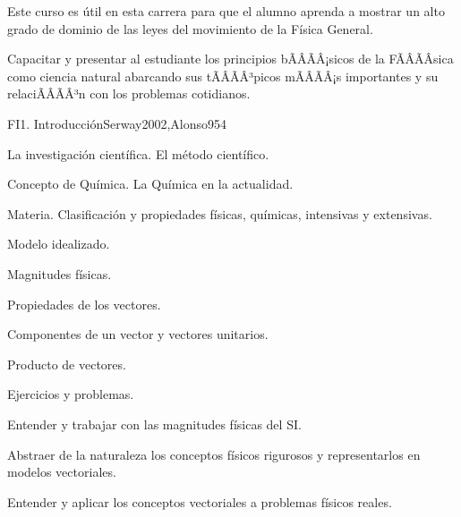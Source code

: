 \begin{sumilla}


\begin{fundamentacion}
Este curso es \'util en esta carrera para que el alumno aprenda a mostrar un alto grado de dominio de las leyes del movimiento de la F\'isica General.
\end{fundamentacion}

\begin{objetivosdelcurso}
\item Capacitar y presentar al estudiante los principios bÃÂÃÂ¡sicos de la FÃÂÃÂ­sica como ciencia natural abarcando sus tÃÂÃÂ³picos mÃÂÃÂ¡s importantes y su relaciÃÂÃÂ³n con los problemas cotidianos.
\end{objetivosdelcurso}

\begin{outcomes}
\end{outcomes}

\begin{unit}{FI1. Introducci\'on}{Serway2002,Alonso95}{4}
\begin{topicos}
      \item La investigaci\'on cient\'ifica. El m\'etodo cient\'ifico.
      \item Concepto de Qu\'imica. La Qu\'imica en la actualidad.
      \item Materia. Clasificaci\'on y propiedades f\'isicas, qu\'imicas, intensivas y extensivas.
      \item Modelo idealizado.
      \item Magnitudes f\'isicas.
      \item Propiedades de los vectores.
      \item Componentes de un vector y vectores unitarios.
      \item Producto de vectores.
      \item Ejercicios y problemas.
   \end{topicos}

   \begin{objetivos}
      \item Entender y trabajar con las magnitudes f\'isicas del SI.
      \item Abstraer de la naturaleza los conceptos f\'isicos rigurosos y
      representarlos en modelos vectoriales.
      \item Entender y aplicar los conceptos vectoriales a problemas f\'isicos reales.
   \end{objetivos}
\end{unit}


\end{sumilla}

